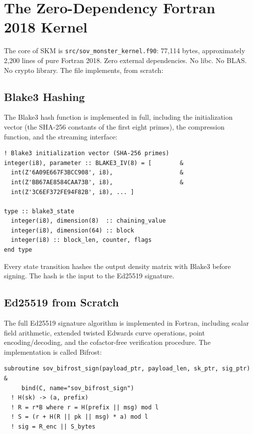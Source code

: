\documentclass[11pt,a4paper]{article}
\begin{document}
\section{The Zero-Dependency Fortran 2018 Kernel}

The core of SKM is \texttt{src/sov\_monster\_kernel.f90}: 77,114 bytes,
approximately 2,200 lines of pure Fortran 2018. Zero external dependencies.
No libc. No BLAS. No crypto library. The file implements, from scratch:

\subsection{Blake3 Hashing}

The Blake3 hash function is implemented in full, including the initialization
vector (the SHA-256 constants of the first eight primes), the compression
function, and the streaming interface:

\begin{lstlisting}[language={}]
! Blake3 initialization vector (SHA-256 primes)
integer(i8), parameter :: BLAKE3_IV(8) = [        &
  int(Z'6A09E667F3BCC908', i8),                   &
  int(Z'BB67AE8584CAA73B', i8),                   &
  int(Z'3C6EF372FE94F82B', i8), ... ]

type :: blake3_state
  integer(i8), dimension(8)  :: chaining_value
  integer(i8), dimension(64) :: block
  integer(i8) :: block_len, counter, flags
end type
\end{lstlisting}

Every state transition hashes the output density matrix with Blake3
before signing. The hash is the input to the Ed25519 signature.

\subsection{Ed25519 from Scratch}

The full Ed25519 signature algorithm is implemented in Fortran, including
scalar field arithmetic, extended twisted Edwards curve operations,
point encoding/decoding, and the cofactor-free verification procedure.
The implementation is called Bifrost:

\begin{lstlisting}[language={}]
subroutine sov_bifrost_sign(payload_ptr, payload_len, sk_ptr, sig_ptr) &
     bind(C, name="sov_bifrost_sign")
  ! H(sk) -> (a, prefix)
  ! R = r*B where r = H(prefix || msg) mod l
  ! S = (r + H(R || pk || msg) * a) mod l
  ! sig = R_enc || S_bytes
\end{lstlisting}
\end{document}
